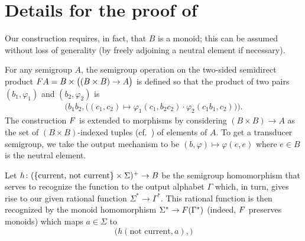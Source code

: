\section{Details for the proof of }

Our construction requires, in fact, that $B$ is a monoid; this can be assumed
without loss of generality (by freely adjoining a neutral element if necessary).

For any semigroup $A$, the semigroup operation on the two-sided semidirect
product $\functor A = B \times \big((B\times B)\to A\big)$ is defined so that
the product of two pairs $(b_1,\varphi_1)$ and $(b_2,\varphi_2)$ is
\begin{align*}
\Big(b_1b_2, \big((c_1,c_2)  \mapsto   \varphi_1(c_1,b_2c_2) \cdot \varphi_2(c_1b_1,c_2)\big)\Big).
\end{align*}
The construction $\functor$ is extended to morphisms by considering $(B\times
B)\to A$ as the set of $(B\times B)$-indexed tuples (cf.~) of
elements of $A$. To get a transducer semigroup, we take the output mechanism to
be $(b,\varphi) \mapsto \varphi(e,e)$ where $e \in B$ is the neutral element.

Let $h\colon (\{\text{current, not current}\} \times \Sigma)^+ \to B$ be the
semigroup homomorphism that serves to recognize the function to the output
alphabet $\Gamma$ which, in turn, gives rise to our given rational function
$\Sigma^* \to \Gamma^*$. This rational function is then recognized by the monoid
homomorphism $\Sigma^* \to \functor(\Gamma^*)$ (indeed, $\functor$ preserves
monoids) which maps $a \in \Sigma$ to
\[ \big(h(\text{not current}, a), \big) \]
